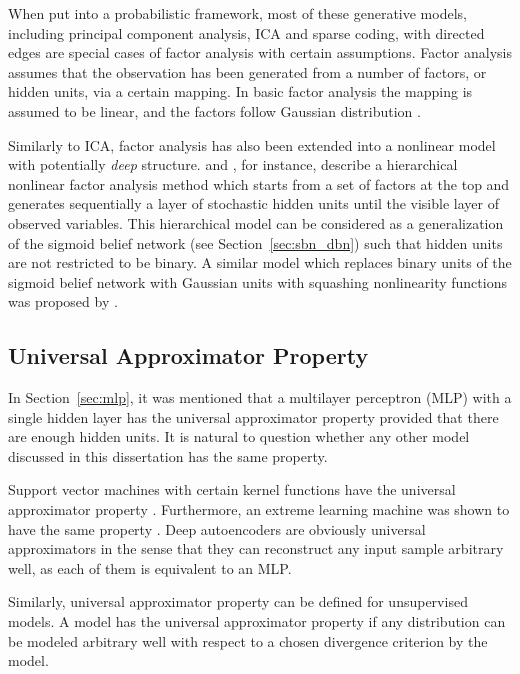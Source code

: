 \documentclass[dissertation,nocontribution]{aaltoseries}
\begin{document}
When put into a probabilistic framework, most of these
generative models, including principal component analysis,
ICA and sparse coding, with directed edges are special cases
of factor analysis with certain assumptions. Factor analysis
assumes that the observation has been generated from a
number of factors, or hidden units, via a certain mapping.
In basic factor analysis the mapping is
assumed to be linear, and the factors follow Gaussian
distribution \citep[see, e.g.,][Chapter 12.2.4]{Bishop2006}. 

Similarly to ICA, factor analysis has also been extended
into a nonlinear model with potentially \textit{deep}
structure. \citet{Raiko2001} and \citet{Raiko2007}, for instance,
describe a hierarchical nonlinear factor analysis method which
starts from a set of factors at the top and generates
sequentially a layer of stochastic hidden units until the
visible layer of observed variables. This hierarchical model
can be considered as a generalization of the sigmoid belief
network (see Section~\ref{sec:sbn_dbn}) such that hidden
units are not restricted to be binary. A similar model which
replaces binary units of the sigmoid belief network with
Gaussian units with squashing nonlinearity functions 
was proposed by \citet{Frey1999}.

\subsection{Universal Approximator Property}
\label{sec:uap}

In Section~\ref{sec:mlp}, it was mentioned that a
multilayer perceptron (MLP) with a single hidden layer has
the universal approximator property provided that there are
enough hidden units. %
It is natural to question whether any other model
discussed in this dissertation has the same property. 

Support vector machines with certain kernel functions have
the universal approximator property \citep{Hammer2003}.
Furthermore, an extreme learning machine was shown to have
the same property \citep{Huang2006tnn}. Deep autoencoders are
obviously universal approximators in the sense that they can
reconstruct any input sample arbitrary well, as each of them
is equivalent to an MLP.

Similarly, universal approximator property can be defined
for unsupervised models. A model has the universal
approximator property if any distribution can be modeled
arbitrary well with respect to a chosen divergence
criterion by the model.
\end{document}
